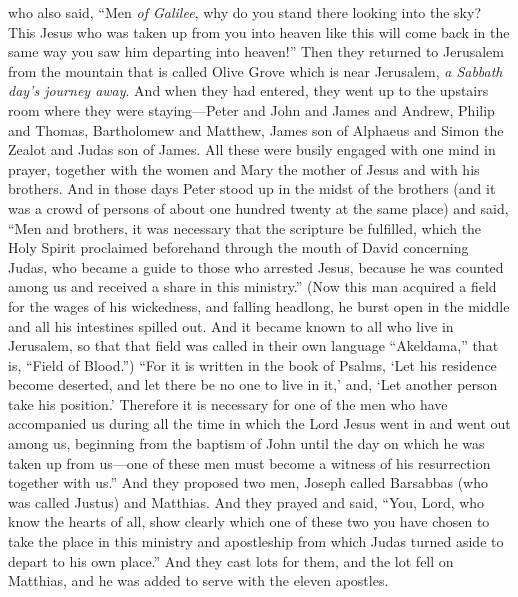 \begin{biblechapter}
\verse who also said, “Men \textit{of Galilee}, why do you stand there looking into the sky? This Jesus who was taken up from you into heaven like this will come back in the same way you saw him departing into heaven!”
 Then they returned to Jerusalem from the mountain that is called Olive Grove which is near Jerusalem, \textit{a Sabbath day’s journey away}.
\verse And when they had entered, they went up to the upstairs room where they were staying—Peter and John and James and Andrew, Philip and Thomas, Bartholomew and Matthew, James son of Alphaeus and Simon the Zealot and Judas son of James.
\verse All these were busily engaged with one mind in prayer, together with the women and Mary the mother of Jesus and with his brothers.
\verse And in those days Peter stood up in the midst of the brothers (and it was a crowd of persons of about one hundred twenty at the same place) and said,
\verse “Men and brothers, it was necessary that the scripture be fulfilled, which the Holy Spirit proclaimed beforehand through the mouth of David concerning Judas, who became a guide to those who arrested Jesus,
\verse because he was counted among us and received a share in this ministry.”
\verse (Now this man acquired a field for the wages of his wickedness, and falling headlong, he burst open in the middle and all his intestines spilled out.
\verse And it became known to all who live in Jerusalem, so that that field was called in their own language “Akeldama,” that is, “Field of Blood.”)
\verse “For it is written in the book of Psalms, ‘Let his residence become deserted, 
and let there be no one to live in it,’ and, ‘Let another person take his position.’
\verse Therefore it is necessary for one of the men who have accompanied us during all the time in which the Lord Jesus went in and went out among us,
\verse beginning from the baptism of John until the day on which he was taken up from us—one of these men must become a witness of his resurrection together with us.”
\verse And they proposed two men, Joseph called Barsabbas (who was called Justus) and Matthias.
\verse And they prayed and said, “You, Lord, who know the hearts of all, show clearly which one of these two you have chosen
\verse to take the place in this ministry and apostleship from which Judas turned aside to depart to his own place.”
\verse And they cast lots for them, and the lot fell on Matthias, and he was added to serve with the eleven apostles.
\end{biblechapter}

